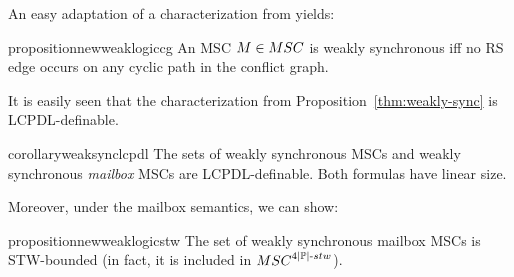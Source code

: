 \documentclass[a4paper,UKenglish,cleveref, autoref, thm-restate]{lipics-v2021}
\begin{document}
An easy adaptation of a characterization from \cite{} yields:

\begin{restatable}{proposition}{newweaklogiccg}
\label{prop:newweaklogiccg}
An MSC $\msc \in \MSCs$ is  weakly synchronous iff no RS edge occurs on any cyclic path in the conflict graph.
\end{restatable}


It is easily seen that the characterization from
Proposition~\ref{thm:weakly-sync} is LCPDL-definable.

\begin{restatable}{corollary}{weaksynclcpdl}
\label{cor:weak-sync-lcpdl}
The sets of weakly synchronous MSCs and weakly synchronous \emph{mailbox} MSCs are LCPDL-definable.
Both formulas have linear size.
\end{restatable}

Moreover, under the mailbox semantics, we can show:

\begin{restatable}{proposition}{newweaklogicstw}
	\label{prop:new-weak-logic-bounded}
The set of weakly synchronous mailbox MSCs is
STW-bounded (in fact, it is included in $\stwMSCs{4|\Procs|}$).
\end{restatable}
\end{document}
